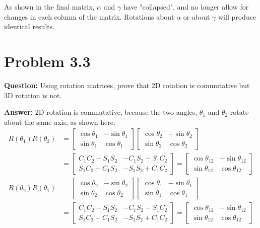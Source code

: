 \documentclass[10pt,letterpaper]{article}
\begin{document}
As shown in the final matrix, $\alpha$ and $\gamma$ have "collapsed", and no longer allow for changes in each column of the matrix. Rotations about $\alpha$ or about $\gamma$ will produce identical results. 



\section{Problem 3.3}
\textbf{Question: } Using rotation matrices, prove that 2D rotation is commutative but 3D rotation is not.

\textbf{Answer: } 2D rotation is commutative, because the two angles, $\theta_1$ and $\theta_2$ rotate about the same axis, as shown here. 
\begin{align*}
R(\theta_1)R(\theta_2) &= \begin{bmatrix}
\cos \theta_1 & -\sin \theta_1 \\
\sin \theta_1 & \cos \theta_1
\end{bmatrix} \begin{bmatrix}
\cos \theta_2 & -\sin \theta_2 \\
\sin \theta_2 & \cos \theta_2
\end{bmatrix} \\
&= \begin{bmatrix}
C_1C_2 - S_1S_2 & -C_1S_2 - S_1C_2 \\
S_1C_2 + C_1S_2 & -S_1S_2 + C_1C_2
\end{bmatrix} = \begin{bmatrix}
\cos \theta_{12} & -\sin \theta_{12} \\
\sin \theta_{12} & \cos \theta_{12}
\end{bmatrix} \\
R(\theta_2)R(\theta_1) &= \begin{bmatrix}
\cos \theta_2 & -\sin \theta_2 \\
\sin \theta_2 & \cos \theta_2
\end{bmatrix} \begin{bmatrix}
\cos \theta_1 & -\sin \theta_1 \\
\sin \theta_1 & \cos \theta_1
\end{bmatrix} \\
&= \begin{bmatrix}
C_1C_2 - S_1S_2 & -C_1S_2 - S_1C_2 \\
S_1C_2 + C_1S_2 & -S_1S_2 + C_1C_2
\end{bmatrix} = \begin{bmatrix}
\cos \theta_{12} & -\sin \theta_{12} \\
\sin \theta_{12} & \cos \theta_{12}
\end{bmatrix} 
\end{align*}
\end{document}
